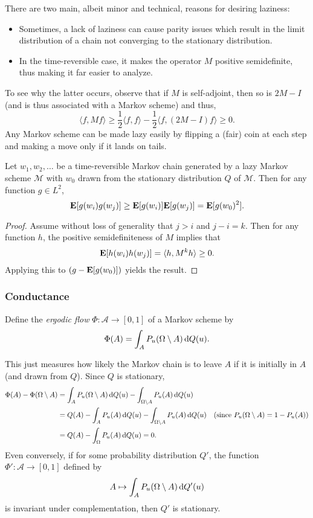 There are two main, albeit minor and technical, reasons for desiring laziness:
\begin{itemize}
	\item Sometimes, a lack of laziness can cause parity issues which result in the limit distribution of a chain not converging to the stationary distribution.
	\item In the time-reversible case, it makes the operator $M$ positive semidefinite, thus making it far easier to analyze.
\end{itemize}
To see why the latter occurs, observe that if $M$ is self-adjoint, then so is $2M-I$ (and is thus associated with a Markov scheme) and thus,
\[ \langle f,M f\rangle \geq \frac{1}{2}\langle f,f\rangle - \frac{1}{2}\langle f,(2M-I)f\rangle \geq 0. \]
Any Markov scheme can be made lazy easily by flipping a (fair) coin at each step and making a move only if it lands on tails.

\begin{lemma}
Let $w_1,w_2,\ldots$ be a time-reversible Markov chain generated by a lazy Markov scheme $\mathcal{M}$ with $w_0$ drawn from the stationary distribution $Q$ of $\mathcal{M}$. Then for any function $g\in L^2$,
\[ \textbf{E}[g(w_i)g(w_j)] \geq \textbf{E}[g(w_i)]\textbf{E}[g(w_j)] = \textbf{E}[g(w_0)^2]. \]
\end{lemma}
\begin{proof}
Assume without loss of generality that $j>i$ and $j-i=k$. Then for any function $h$, the positive semidefiniteness of $M$ implies that
\[ \textbf{E}[h(w_i)h(w_j)] = \langle h, M^k h\rangle \geq 0. \]
Applying this to $(g - \textbf{E}[g(w_0)])$ yields the result.
\end{proof}

\subsubsection{Conductance}

\begin{definition}
	\label{def: ergodic flow}
	Define the \textit{ergodic flow} $\Phi:\mathcal{A}\to[0,1]$ of a Markov scheme by
	\[ \Phi(A) = \int_A P_u(\Omega \setminus A) \operatorname{d}\!{Q}(u). \]
\end{definition}

This just measures how likely the Markov chain is to leave $A$ if it is initially in $A$ (and drawn from $Q$). Since $Q$ is stationary,
\begin{align*}
	\Phi(A) - \Phi(\Omega\setminus A) &= \int_A P_u(\Omega\setminus A)\operatorname{d}\!{Q}(u) - \int_{\Omega\setminus A} P_u(A)\operatorname{d}\!{Q}(u) \\
	&= Q(A) - \int_A P_u(A)\operatorname{d}\!{Q}(u) - \int_{\Omega\setminus A} P_u(A)\operatorname{d}\!{Q}(u) & (\text{since } P_u(\Omega\setminus A)=1-P_u(A)) \\
	&= Q(A) - \int_\Omega P_u(A)\operatorname{d}\!{Q}(u) = 0.
\end{align*}
Even conversely, if for some probability distribution $Q'$, the function $\Phi':\mathcal{A}\to[0,1]$ defined by
\[ A\mapsto \int_A P_u(\Omega\setminus A)\operatorname{d}\!{Q}'(u) \]
is invariant under complementation, then $Q'$ is stationary.\\

